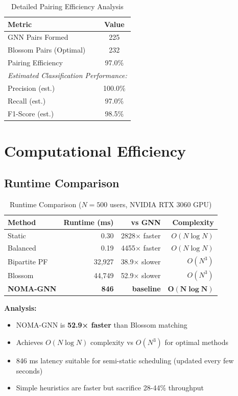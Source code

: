 \begin{table}[H]
\centering
\begin{tabular}{lc}
\toprule
\textbf{Metric} & \textbf{Value} \\
\midrule
GNN Pairs Formed & 225 \\
Blossom Pairs (Optimal) & 232 \\
Pairing Efficiency & 97.0\% \\
\midrule
\multicolumn{2}{l}{\textit{Estimated Classification Performance:}} \\
Precision (est.) & 100.0\% \\
Recall (est.) & 97.0\% \\
F1-Score (est.) & 98.5\% \\
\bottomrule
\end{tabular}
\caption{Detailed Pairing Efficiency Analysis}
\label{tab:pairing_efficiency_detailed}
\end{table}

\section{Computational Efficiency}

\subsection{Runtime Comparison}

\begin{table}[H]
\centering
\begin{tabular}{lrrr}
\toprule
\textbf{Method} & \textbf{Runtime (ms)} & \textbf{vs GNN} & \textbf{Complexity} \\
\midrule
Static & 0.30 & 2828× faster & $O(N \log N)$ \\
Balanced & 0.19 & 4455× faster & $O(N \log N)$ \\
Bipartite PF & 32,927 & 38.9× slower & $O(N^3)$ \\
Blossom & 44,749 & 52.9× slower & $O(N^3)$ \\
\textbf{NOMA-GNN} & \textbf{846} & \textbf{baseline} & $\boldsymbol{O(N \log N)}$ \\
\bottomrule
\end{tabular}
\caption{Runtime Comparison ($N=500$ users, NVIDIA RTX 3060 GPU)}
\label{tab:runtime}
\end{table}

\textbf{Analysis:}
\begin{itemize}
    \item NOMA-GNN is \textbf{52.9× faster} than Blossom matching
    \item Achieves $O(N \log N)$ complexity vs $O(N^3)$ for optimal methods
    \item 846 ms latency suitable for semi-static scheduling (updated every few seconds)
    \item Simple heuristics are faster but sacrifice 28-44\% throughput
\end{itemize}

